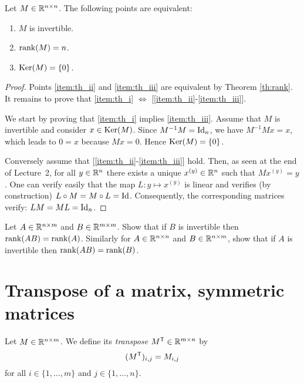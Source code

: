 \documentclass[11pt,nocut]{article}
\begin{document}
\begin{theorem}
	Let $M \in \mathbb{R}^{n \times n}$. The following points are equivalent:
	\begin{enumerate}[label=(\roman*)]
		\item \label{item:th_i} $M$ is invertible.
		\item \label{item:th_ii} ${{\rm rank}}(M) = n$.
		\item \label{item:th_iii} ${{\rm Ker}}(M) = \{0\}$.
	\end{enumerate}
\end{theorem}
\begin{proof}
	Points \ref{item:th_ii} and \ref{item:th_iii} are equivalent by Theorem \ref{th:rank}. 
	It remains to prove that \ref{item:th_i} $\Leftrightarrow$ [\ref{item:th_ii}-\ref{item:th_iii}].

	We start by proving that \ref{item:th_i} implies \ref{item:th_iii}. Assume that $M$ is invertible and consider $x \in {{\rm Ker}}(M)$. Since $M^{-1} M = {{\rm Id}}_n$, we have $M^{-1} M x = x$, which leads to $0 = x$ because $Mx = 0$. Hence ${{\rm Ker}}(M) = \{0\}$.

	Conversely assume that [\ref{item:th_ii}-\ref{item:th_iii}] hold. Then, as seen at the end of Lecture~2, for all $y \in \mathbb{R}^n$ there exists a unique $x^{(y)}\in \mathbb{R}^n$ such that $Mx^{(y)} = y$. One can verify easily that the map $L: y \mapsto x^{(y)}$ is linear and verifies (by construction) $L \circ M = M \circ L = {{\rm Id}}$. Consequently, the corresponding matrices verify: $LM=ML={{\rm Id}}_n$.
\end{proof}


\begin{exercise}
	Let $A \in \mathbb{R}^{n \times m}$ and $B \in \mathbb{R}^{m \times m}$. Show that if $B$ is invertible then ${{\rm rank}}(AB) = {{\rm rank}}(A)$.
	Similarly for $A \in \mathbb{R}^{n \times n}$ and $B \in \mathbb{R}^{n \times m}$, show that if $A$ is invertible then ${{\rm rank}}(AB) = {{\rm rank}}(B)$.
\end{exercise}


\section{Transpose of a matrix, symmetric matrices}

\begin{definition}[Transpose]
	Let $M \in \mathbb{R}^{n \times m}$. We define its \emph{transpose} $M^{{\sf T}} \in \mathbb{R}^{m \times n}$ by
	$$
	(M^{{\sf T}})_{i,j} = M_{i,j}
	$$
	for all $i \in \{1, \dots, m\}$ and $j \in \{1, \dots, n\}$.
\end{definition}
\end{document}
